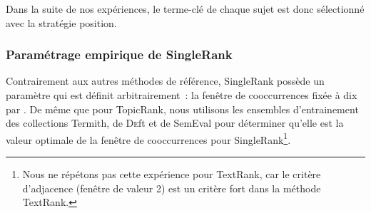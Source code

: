         Dans la suite de nos expériences, le terme-clé de chaque sujet est donc
        sélectionné avec la stratégie position.

      \subsubsection{Paramétrage empirique de SingleRank}
      \label{subsubsec:main:domain_independent_keyphrase_extraction-unsupervised_automatic_keyphrase_extraction-evaluation-empirical_setting_of_singlerank}
        Contrairement aux autres méthodes de référence, SingleRank possède un
        paramètre qui est définit arbitrairement~: la fenêtre de cooccurrences
        fixée à dix par . De même que pour TopicRank,
        nous utilisons les ensembles d'entrainement des collections Termith, de
        \textsc{De}ft et de SemEval pour déterminer qu'elle est la valeur
        optimale de la fenêtre de cooccurrences pour SingleRank\footnote{Nous ne
        répétons pas cette expérience pour TextRank, car le critère d'adjacence
        (fenêtre de valeur 2) est un critère fort dans la méthode TextRank.}. 

